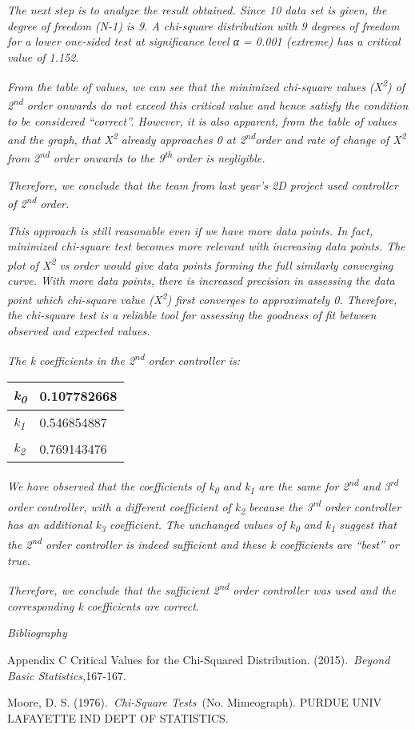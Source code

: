 \documentclass[]{article}
\begin{document}
\emph{The next step is to analyze the result obtained. Since 10 data set
is given, the degree of freedom (N-1) is 9. A chi-square distribution
with 9 degrees of freedom for a lower one-sided test at significance
level α = 0.001 (extreme) has a critical value of 1.152.}

\emph{From the table of values, we can see that the minimized chi-square
values (X\textsuperscript{2}) of 2\textsuperscript{nd} order onwards do
not exceed this critical value and hence satisfy the condition to be
considered ``correct''. However, it is also apparent, from the table of
values and the graph, that X\textsuperscript{2} already approaches 0 at
2\textsuperscript{nd}order and rate of change of X\textsuperscript{2}
from 2\textsuperscript{nd} order onwards to the 9\textsuperscript{th}
order is negligible. }

\emph{Therefore, we conclude that the team from last year's 2D project
used controller of 2\textsuperscript{nd} order.}

\emph{This approach is still reasonable even if we have more data
points. In fact, minimized chi-square test becomes more relevant with
increasing data points. The plot of X\textsuperscript{2} vs order would
give data points forming the full similarly converging curve. With more
data points, there is increased precision in assessing the data point
which chi-square value (X\textsuperscript{2}) first converges to
approximately 0. Therefore, the chi-square test is a reliable tool for
assessing the goodness of fit between observed and expected values.}

\emph{The k coefficients in the 2\textsuperscript{nd} order controller
is:}

\begin{longtable}[]{@{}ll@{}}
\toprule
\emph{k\textsubscript{0}} & 0.107782668\tabularnewline
\midrule
\endhead
\emph{k\textsubscript{1}} & 0.546854887\tabularnewline
\emph{k\textsubscript{2}} & 0.769143476\tabularnewline
\bottomrule
\end{longtable}

\emph{We have observed that the coefficients of k\textsubscript{0} and
k\textsubscript{1} are the same for 2\textsuperscript{nd} and
3\textsuperscript{rd} order controller, with a different coefficient of
k\textsubscript{2} because the 3\textsuperscript{rd} order controller
has an additional k\textsubscript{3} coefficient. The unchanged values
of k\textsubscript{0} and k\textsubscript{1} suggest that the
2\textsuperscript{nd} order controller is indeed sufficient and these k
coefficients are ``best'' or true.}

\emph{Therefore, we conclude that the sufficient 2\textsuperscript{nd}
order controller was used and the corresponding k coefficients are
correct.}

\emph{\emph{Bibliography}}

Appendix C Critical Values for the Chi-Squared Distribution.
(2015).~\emph{Beyond Basic Statistics,}167-167.

Moore, D. S. (1976).~\emph{Chi-Square Tests}~(No. Mimeograph). PURDUE
UNIV LAFAYETTE IND DEPT OF STATISTICS.
\end{document}
